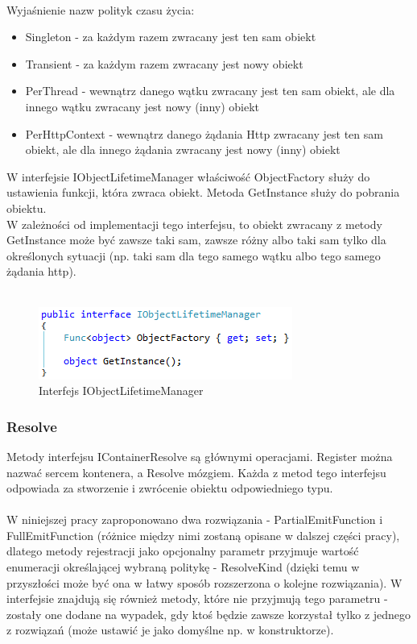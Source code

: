 \documentclass[12pt]{article}
\begin{document}
\\
Wyjaśnienie nazw polityk czasu życia:
\begin{itemize}
	\item Singleton - za każdym razem zwracany jest ten sam obiekt
	\item Transient - za każdym razem zwracany jest nowy obiekt
	\item PerThread - wewnątrz danego wątku zwracany jest ten sam obiekt, ale dla innego wątku zwracany jest nowy (inny) obiekt
	\item PerHttpContext - wewnątrz danego żądania Http zwracany jest ten sam obiekt, ale dla innego żądania zwracany jest nowy (inny) obiekt
\end{itemize}

W interfejsie IObjectLifetimeManager właściwość ObjectFactory służy do ustawienia funkcji, która zwraca obiekt. Metoda GetInstance służy do pobrania obiektu.\\
W zależności od implementacji tego interfejsu, to obiekt zwracany z metody GetInstance może być zawsze taki sam, zawsze różny albo taki sam tylko dla określonych sytuacji (np. taki sam dla tego samego wątku albo tego samego żądania http).\\ \\
\begin{figure}[H]
	\begin{center}
  		\includegraphics{IObjectLifetimeManager.png}
  		\caption{Interfejs IObjectLifetimeManager}
  		\label{fig:IObjectLifetimeManager}
	\end{center}
\end{figure}

\subsubsection{Resolve}
Metody interfejsu IContainerResolve są głównymi operacjami. Register można nazwać sercem kontenera, a Resolve mózgiem. Każda z metod tego interfejsu odpowiada za stworzenie i zwrócenie obiektu odpowiedniego typu.\\
\\
W niniejszej pracy zaproponowano dwa rozwiązania - PartialEmitFunction i FullEmitFunction (różnice między nimi zostaną opisane w dalszej części pracy), dlatego metody rejestracji jako opcjonalny parametr przyjmuje wartość enumeracji określającej wybraną politykę - ResolveKind (dzięki temu w przyszłości może być ona w łatwy sposób rozszerzona o kolejne rozwiązania). W interfejsie znajdują się również metody, które nie przyjmują tego parametru - zostały one dodane na wypadek, gdy ktoś będzie zawsze korzystał tylko z jednego z rozwiązań (może ustawić je jako domyślne np. w konstruktorze).
\end{document}
